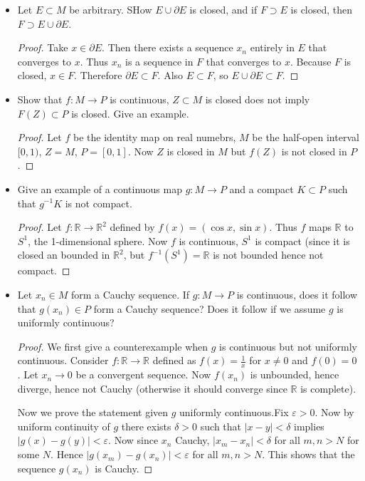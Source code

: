 \begin{itemize}
	\item Let $E \subset M$ be arbitrary. SHow $E \cup \partial E$ is closed, and if $F \supset E$ is closed, then $F \supset E \cup \partial E$.
\begin{proof}
	Take $x \in \partial E$. Then there exists a sequence $x_n$ entirely in $E$ that converges to $x$. Thus $x_n$ is a sequence in $F$ that converges to $x$. Because $F$ is closed, $x \in F$. Therefore $\partial E \subset  F$. Also $E \subset F$, so $E \cup \partial E \subset F$.
\end{proof}


	\item Show that $f:M\to P$ is continuous, $Z \subset M$ is closed does not imply $F(Z) \subset P$ is closed. Give an example.
\begin{proof}
	Let $f$ be the identity map on real numebrs, $M$ be the half-open interval $[0,1)$,  $Z = M$, $P = [0,1]$. Now $Z$ is closed in $M$ but $f(Z)$ is not closed in $P$.
\end{proof}

	\item Give an example of a continuous map $g: M \to  P$ and a compact $K \subset P$ such that $g^{-1} K $ is not compact.
\begin{proof}
	Let $f:\mathbb{R} \to  \mathbb{R}^2$ defined by $f(x) = \left( \cos x, \sin x \right)$. Thus $f$ maps $\mathbb{R}$ to $S^1$, the 1-dimensional sphere. Now $f$ is continuous, $S^1$ is compact (since it is closed an bounded in $ \mathbb{R}^2$, but $f^{-1} (S^1) = \mathbb{R}$ is not bounded hence not compact.
\end{proof}
\item Let $x_n \in M$ form a Cauchy sequence. If $g: M \to  P$ is continuous, does it follow that $g(x_n) \in P$ form a Cauchy sequence? Does it follow if we assume $g$ is uniformly continuous?
\begin{proof}
	We first give a counterexample when $g$ is continuous but not uniformly continuous. Consider  $f: \mathbb{R}  \to  \mathbb{R}$ defined as $f(x) = \frac{1}{x}$ for $x \neq 0$ and $f(0) = 0$. Let $x_n \to 0$ be a convergent sequence. Now $f(x_n)$ is unbounded, hence diverge, hence not Cauchy (otherwise it should converge since $\mathbb{R}$ is complete).

	Now we prove the statement given $g$ uniformly continuous.Fix $\varepsilon>0$. Now by uniform continuity of $g $ there exists $\delta>0$ such that $|x - y| < \delta$ implies $\left| g(x) - g(y) \right| <\varepsilon$. Now since $x_n$ Cauchy, $\left| x_m - x_n \right| <\delta$ for all $m, n > N$ for some $N$. Hence $\left| g(x_m) - g(x_n) \right| <\varepsilon$ for all $m, n > N$. This shows that the sequence $g(x_n)$ is Cauchy.
\end{proof}



\end{itemize}
